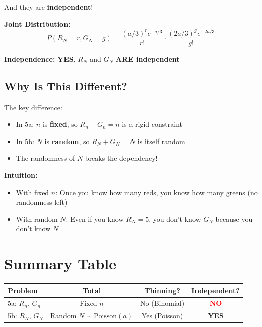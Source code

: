 \documentclass[12pt]{article}
\begin{document}
And they are \textbf{independent}!

\begin{tcolorbox}[colback=green!5!white,colframe=green!75!black,title=Answer for 5b]
\textbf{Joint Distribution:}
\begin{equation*}
P(R_N = r, G_N = g) = \frac{(a/3)^r e^{-a/3}}{r!} \cdot \frac{(2a/3)^g e^{-2a/3}}{g!}
\end{equation*}

\textbf{Independence:} \textcolor{green!50!black}{\textbf{YES}}, $R_N$ and $G_N$ \textbf{ARE independent}
\end{tcolorbox}

\subsection*{Why Is This Different?}

The key difference:
\begin{itemize}
    \item In 5a: $n$ is \textbf{fixed}, so $R_n + G_n = n$ is a rigid constraint
    \item In 5b: $N$ is \textbf{random}, so $R_N + G_N = N$ is itself random
    \item The randomness of $N$ breaks the dependency!
\end{itemize}

\textbf{Intuition:}
\begin{itemize}
    \item With fixed $n$: Once you know how many reds, you know how many greens (no randomness left)
    \item With random $N$: Even if you know $R_N = 5$, you don't know $G_N$ because you don't know $N$
\end{itemize}

\section*{Summary Table}

\begin{center}
\begin{tabular}{|l|c|c|c|}
\hline
\textbf{Problem} & \textbf{Total} & \textbf{Thinning?} & \textbf{Independent?}\\
\hline
5a: $R_n$, $G_n$ & Fixed $n$ & No (Binomial) & \textcolor{red}{\textbf{NO}}\\
\hline
5b: $R_N$, $G_N$ & Random $N \sim \text{Poisson}(a)$ & Yes (Poisson) & \textcolor{green!50!black}{\textbf{YES}}\\
\hline
\end{tabular}
\end{center}
\end{document}
